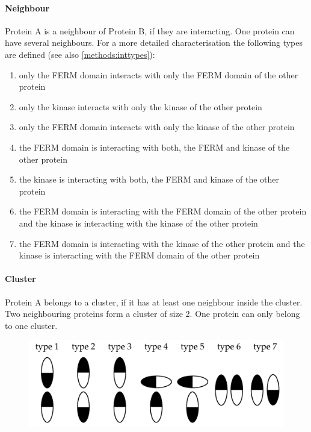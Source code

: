 \paragraph{Neighbour} Protein A is a neighbour of Protein B, if they are interacting. One protein can have several neighbours. For a more detailed characterisation the following types are defined (see also \autoref{methods:inttypes}):
\begin{enumerate}[label={type \theenumi:}, leftmargin=*]
	\item only the FERM domain interacts with only the FERM domain of the other protein
	\item only the kinase interacts with only the kinase of the other protein
	\item only the FERM domain interacts with only the kinase of the other protein
	\item the FERM domain is interacting with both, the FERM and kinase of the other protein
	\item the kinase is interacting with both, the FERM and kinase of the other protein
	\item the FERM domain is interacting with the FERM domain of the other protein and the kinase is interacting with the kinase of the other protein
	\item the FERM domain is interacting with the kinase of the other protein and the kinase is interacting with the FERM domain of the other protein
\end{enumerate}
\paragraph{Cluster} Protein A belongs to a cluster, if it has at least one neighbour inside the cluster. Two neighbouring proteins form a cluster of size 2. One protein can only belong to one cluster.
%
%
%
\begin{figure}
	\centering
	\includegraphics[width=\textwidth]{figures/introduction/classification}
	\label{methods:inttypes}
\end{figure}
%
%
%